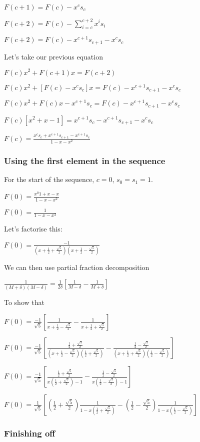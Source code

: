 \(F(c+1)=F(c)-x^c s_c\)

\(F(c+2)=F(c)-\sum^{c+2}_{i=c} x^i s_i\)

\(F(c+2)=F(c)-x^{c+1}s_{c+1}-x^c s_c\)

Let's take our previous equation

\(F(c)x^2+F(c+1)x=F(c+2)\)

\(F(c)x^2+[F(c)-x^c s_c]x=F(c)-x^{c+1}s_{c+1}-x^c s_c\)

\(F(c)x^2+F(c)x-x^{c+1} s_c=F(c)-x^{c+1}s_{c+1}-x^c s_c\)

\(F(c)[x^2+x-1]=x^{c+1}s_c-x^{c+1}s_{c+1}-x^c s_c\)

\(F(c)=\frac{x^c s_c + x^{c+1}s_{c+1}-x^{c+1}s_c}{1-x-x^2}\)

\subsubsection{Using the first element in the sequence}

For the start of the sequence, \(c=0\), \(s_0=s_1=1\).

\(F(0)=\frac{x^0 1 + x - x}{1-x-x^2}\)

\(F(0)=\frac{1}{1-x-x^2}\)

Let's factorise this:

\(F(0)=\frac{-1}{(x+\frac{1}{2}+\frac{\sqrt 5}{2})(x+\frac{1}{2}-\frac{\sqrt 5}{2})}\)

We can then use partial fraction decomposition

\(\frac{1}{(M+\delta)(M-\delta)}=\frac{1}{2\delta}[\frac{1}{M-\delta}-\frac{1}{M+\delta}]\)

To show that

\(F(0)=\frac{-1}{\sqrt 5}[\frac{1}{x+\frac{1}{2}-\frac{\sqrt 5}{2}}-\frac{1}{x+\frac{1}{2}+\frac{\sqrt 5}{2}}]\)

\(F(0)=\frac{-1}{\sqrt 5}[\frac{\frac{1}{2}+\frac{\sqrt 5}{2}}{(x+\frac{1}{2}-\frac{\sqrt 5}{2})(\frac{1}{2}+\frac{\sqrt 5}{2})}-\frac{\frac{1}{2}-\frac{\sqrt 5}{2}}{(x+\frac{1}{2}+\frac{\sqrt 5}{2})(\frac{1}{2}-\frac{\sqrt 5}{2})}]\)

\(F(0)=\frac{-1}{\sqrt 5}[\frac{\frac{1}{2}+\frac{\sqrt 5}{2}}{x(\frac{1}{2}+\frac{\sqrt 5}{2})-1}-\frac{\frac{1}{2}-\frac{\sqrt 5}{2}}{x(\frac{1}{2}-\frac{\sqrt 5}{2})-1}]\)

\(F(0)=\frac{1}{\sqrt 5}[(\frac{1}{2}+\frac{\sqrt 5}{2})\frac{1}{1-x(\frac{1}{2}+\frac{\sqrt 5}{2})}-(\frac{1}{2}-\frac{\sqrt 5}{2})\frac{1}{1-x(\frac{1}{2}-\frac{\sqrt 5}{2})}]\)

\subsubsection{Finishing off}

